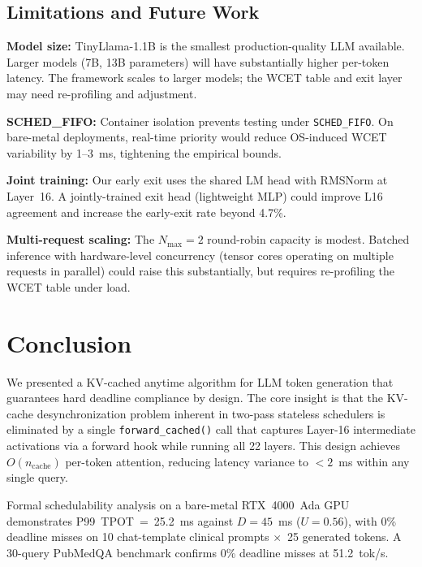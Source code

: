 \documentclass[conference]{IEEEtran}
\begin{document}
\subsection{Limitations and Future Work}

\textbf{Model size:} TinyLlama-1.1B is the smallest production-quality LLM available. Larger models (7B, 13B parameters) will have substantially higher per-token latency. The framework scales to larger models; the WCET table and exit layer may need re-profiling and adjustment.

\textbf{SCHED\_FIFO:} Container isolation prevents testing under \texttt{SCHED\_FIFO}. On bare-metal deployments, real-time priority would reduce OS-induced WCET variability by 1--3~ms, tightening the empirical bounds.

\textbf{Joint training:} Our early exit uses the shared LM head with RMSNorm at Layer~16. A jointly-trained exit head (lightweight MLP) could improve L16 agreement and increase the early-exit rate beyond 4.7\%.

\textbf{Multi-request scaling:} The $N_{\max} = 2$ round-robin capacity is modest. Batched inference with hardware-level concurrency (tensor cores operating on multiple requests in parallel) could raise this substantially, but requires re-profiling the WCET table under load.

\section{Conclusion}

We presented a KV-cached anytime algorithm for LLM token generation that guarantees hard deadline compliance by design. The core insight is that the KV-cache desynchronization problem inherent in two-pass stateless schedulers is eliminated by a single \texttt{forward\_cached()} call that captures Layer-16 intermediate activations via a forward hook while running all 22 layers. This design achieves $O(n_{\text{cache}})$ per-token attention, reducing latency variance to $<2$~ms within any single query.

Formal schedulability analysis on a bare-metal RTX~4000~Ada GPU demonstrates P99~TPOT~=~25.2~ms against $D=45$~ms ($U=0.56$), with 0\% deadline misses on 10 chat-template clinical prompts $\times$~25 generated tokens. A 30-query PubMedQA benchmark confirms 0\% deadline misses at 51.2~tok/s.
\end{document}

